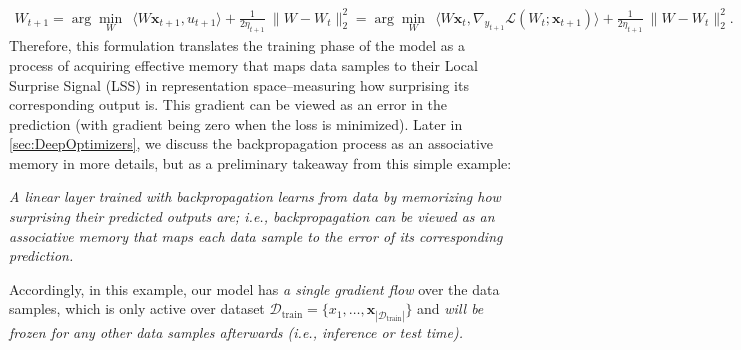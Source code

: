 \documentclass{article}
\newcommand{\inner}[2]{\langle #1, #2 \rangle}
\begin{document}
\begin{align}
    W_{t+1} = \arg\min_{W} \:\:  \inner{W \boldsymbol{x}_{t+1}}{u_{t+1}} + \frac{1}{2\eta_{t+1}}\:\|W - W_{t} \|^{2}_2 = \arg\min_{W} \:\:  \inner{W \boldsymbol{x}_t}{\nabla_{y_{t+1}} \mathcal{L}(W_t; \boldsymbol{x}_{t+1})} + \frac{1}{2\eta_{t+1}}\:\|W - W_{t} \|^{2}_2.
\end{align}
 Therefore, this formulation translates the training phase of the model as a process of acquiring effective memory that maps data samples to their Local Surprise Signal (LSS) in representation space–measuring how surprising its corresponding output is. This gradient can be viewed as an error in the prediction (with gradient being zero when the loss is minimized). Later in \autoref{sec:DeepOptimizers}, we discuss the backpropagation process as an associative memory in more details, but as a preliminary takeaway from this simple example: 

\vspace{8pt}
 \begin{myboxi}
     \textit{A linear layer trained with backpropagation learns from data by memorizing how surprising their predicted outputs are; i.e., backpropagation can be viewed as an associative memory that maps each data sample to the error of its corresponding prediction. }
 \end{myboxi}
\vspace{8pt}

 Accordingly, in this example, our model has \emph{a single gradient flow} over the data samples, which is only active over dataset $\mathcal{D}_{\text{train}} = \{x_1, \dots, \boldsymbol{x}_{|\mathcal{D}_{\text{train}}|}\}$ and \textit{will be frozen for any other data samples afterwards (i.e., inference or test time). }   
\end{document}
